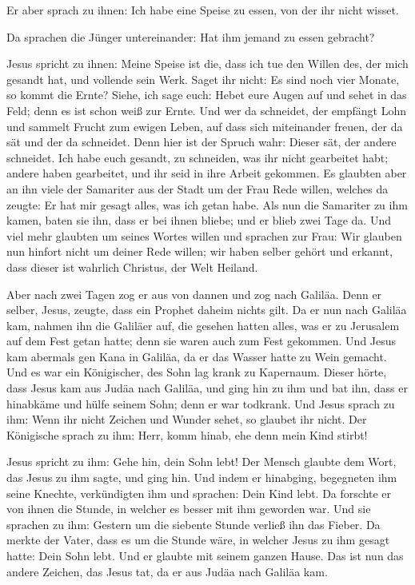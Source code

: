  Er aber sprach zu ihnen: Ich habe eine Speise zu essen,
von der ihr nicht wisset.

 Da sprachen die Jünger untereinander: Hat ihm jemand zu
essen gebracht?

 Jesus spricht zu ihnen: Meine Speise ist die, dass ich
tue den Willen des, der mich gesandt hat, und vollende sein Werk.
 Saget ihr nicht: Es sind noch vier Monate, so kommt die
Ernte? Siehe, ich sage euch: Hebet eure Augen auf und sehet in das Feld;
denn es ist schon weiß zur Ernte.  Und wer da schneidet,
der empfängt Lohn und sammelt Frucht zum ewigen Leben, auf dass sich
miteinander freuen, der da sät und der da schneidet. 
Denn hier ist der Spruch wahr: Dieser sät, der andere schneidet.
 Ich habe euch gesandt, zu schneiden, was ihr nicht
gearbeitet habt; andere haben gearbeitet, und ihr seid in ihre Arbeit
gekommen.  Es glaubten aber an ihn viele der Samariter
aus der Stadt um der Frau Rede willen, welches da zeugte: Er hat mir
gesagt alles, was ich getan habe.  Als nun die Samariter
zu ihm kamen, baten sie ihn, dass er bei ihnen bliebe; und er blieb zwei
Tage da.  Und viel mehr glaubten um seines Wortes willen
 und sprachen zur Frau: Wir glauben nun hinfort nicht um
deiner Rede willen; wir haben selber gehört und erkannt, dass dieser ist
wahrlich Christus, der Welt Heiland.

 Aber nach zwei Tagen zog er aus von dannen und zog nach
Galiläa.  Denn er selber, Jesus, zeugte, dass ein Prophet
daheim nichts gilt.  Da er nun nach Galiläa kam, nahmen
ihn die Galiläer auf, die gesehen hatten alles, was er zu Jerusalem auf
dem Fest getan hatte; denn sie waren auch zum Fest gekommen.
 Und Jesus kam abermals gen Kana in Galiläa, da er das
Wasser hatte zu Wein gemacht.  Und es war ein
Königischer, des Sohn lag krank zu Kapernaum. Dieser hörte, dass Jesus
kam aus Judäa nach Galiläa, und ging hin zu ihm und bat ihn, dass er
hinabkäme und hülfe seinem Sohn; denn er war todkrank. 
Und Jesus sprach zu ihm: Wenn ihr nicht Zeichen und Wunder sehet, so
glaubet ihr nicht.  Der Königische sprach zu ihm: Herr,
komm hinab, ehe denn mein Kind stirbt!

 Jesus spricht zu ihm: Gehe hin, dein Sohn lebt! Der
Mensch glaubte dem Wort, das Jesus zu ihm sagte, und ging hin.
 Und indem er hinabging, begegneten ihm seine Knechte,
verkündigten ihm und sprachen: Dein Kind lebt.  Da
forschte er von ihnen die Stunde, in welcher es besser mit ihm geworden
war. Und sie sprachen zu ihm: Gestern um die siebente Stunde verließ ihn
das Fieber.  Da merkte der Vater, dass es um die Stunde
wäre, in welcher Jesus zu ihm gesagt hatte: Dein Sohn lebt. Und er
glaubte mit seinem ganzen Hause.  Das ist nun das andere
Zeichen, das Jesus tat, da er aus Judäa nach Galiläa kam.


